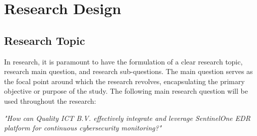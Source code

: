 \chapter{Research Design}
\begin{multicols}{2}
  \section{Research Topic}
  In research, it is paramount to have the formulation of a clear research topic, research main question,
  and research sub-questions. The main question serves as the focal point around which the research revolves,
  encapsulating the primary objective or purpose of the study.
  The following main research question will be used throughout the research:
  \begin{center}
    \textit{"How can Quality ICT B.V. effectively integrate and leverage SentinelOne EDR platform
      for continuous cybersecurity monitoring?"}
  \end{center}

\end{multicols}
